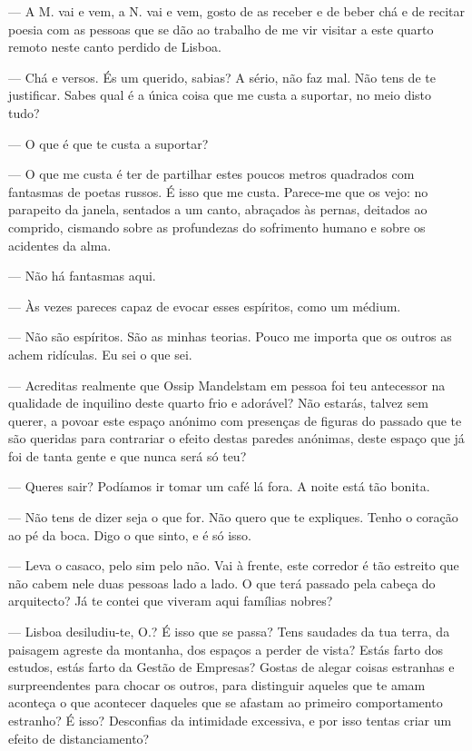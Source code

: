 --- A M. vai e vem, a N. vai e vem, gosto de as receber e de beber chá e
  de recitar poesia com as pessoas que se dão ao trabalho de me vir
  visitar a este quarto remoto neste canto perdido de Lisboa.

--- Chá e versos. És um querido, sabias? A sério, não faz mal. Não tens de
  te justificar. Sabes qual é a única coisa que me custa a suportar, no
  meio disto tudo?

--- O que é que te custa a suportar?

--- O que me custa é ter de partilhar estes poucos metros quadrados com
  fantasmas de poetas russos. É isso que me custa. Parece-me que os
  vejo: no parapeito da janela, sentados a um canto, abraçados às
  pernas, deitados ao comprido, cismando sobre as profundezas do
  sofrimento humano e sobre os acidentes da alma.

--- Não há fantasmas aqui.

--- Às vezes pareces capaz de evocar esses espíritos, como um médium.

--- Não são espíritos. São as minhas teorias. Pouco me importa que os
  outros as achem ridículas. Eu sei o que sei.

--- Acreditas realmente que Ossip Mandelstam em pessoa
foi teu antecessor na qualidade de inquilino deste quarto frio e
adorável? Não estarás, talvez sem querer, a povoar este espaço anónimo
com presenças de figuras do passado que te são queridas para
contrariar o efeito destas paredes anónimas, deste espaço que já foi de
tanta gente e que nunca será só teu?

--- Queres sair? Podíamos ir tomar um café lá fora. A noite está tão
  bonita.

--- Não tens de dizer seja o que for. Não quero que te expliques. Tenho o
  coração ao pé da boca. Digo o que sinto, e é só isso.

--- Leva o casaco, pelo sim pelo não. Vai à frente, este corredor é tão
  estreito que não cabem nele duas pessoas lado a lado. O que terá
  passado pela cabeça do arquitecto? Já te contei que viveram aqui
  famílias nobres?

--- Lisboa desiludiu-te, O.? É isso que se passa? Tens saudades da tua
  terra, da paisagem agreste da montanha, dos espaços a perder de
  vista? Estás farto dos estudos, estás farto da Gestão de Empresas?
  Gostas de alegar coisas estranhas e surpreendentes para chocar os
  outros, para distinguir aqueles que te amam aconteça o que acontecer
  daqueles que se afastam ao primeiro comportamento estranho? É isso?
  Desconfias da intimidade excessiva, e por isso tentas criar um efeito
  de distanciamento?

